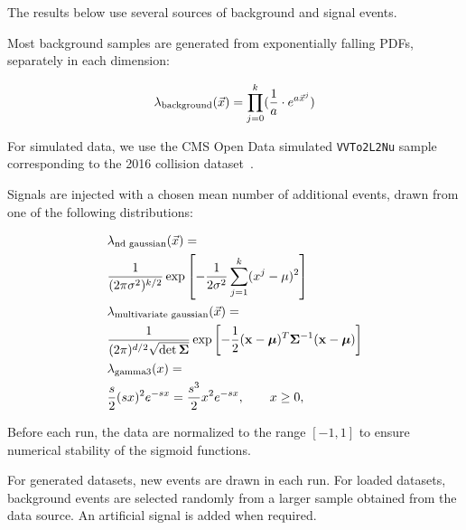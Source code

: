\documentclass[paper/ddppaper2.tex]{subfiles}
\begin{document}
The results below use several sources of background and signal events.

Most background samples are generated from exponentially falling PDFs, separately in each dimension:

\begin{equation}
    {{\lambda}_{\text{background}}(\vec{{x}})} = \prod\limits_{j=0}^k (\dfrac{1}{a} \cdot e^{a\vec{{x}}^j})
\end{equation}

For simulated data, we use the CMS Open Data simulated \texttt{VVTo2L2Nu} sample corresponding to the 2016 collision dataset~\cite{CMS_OpenData_VVTo2L2Nu_2016}.

Signals are injected with a chosen mean number of additional events, drawn from one of the following distributions:

\begin{equation}
\label{eq:signal-shapes}
\begin{aligned}
    &\dist{\text{nd gaussian}}
    ={}\\
    &
    \frac{1}{(2\pi\sigma^2)^{k/2}}
    \exp\left[
        -\frac{1}{2\sigma^2}
        \sum_{j=1}^{k}(x^j-\mu)^2
    \right]
    \\
    &\dist{\text{multivariate gaussian}}
    ={}\\
    &
    \frac{1}
    {(2\pi)^{d/2}\sqrt{\det\boldsymbol{\Sigma}}}
    \exp\left[
        -\frac{1}{2}
        (\mathbf{x}-\boldsymbol{\mu})^{T}
        \boldsymbol{\Sigma}^{-1}
        (\mathbf{x}-\boldsymbol{\mu})
    \right]
    \\
    &\pdf_{\text{gamma3}}(\eventsymbol)
    ={}\\
    &
    \frac{s}{2}
    (s \eventsymbol)^2
    e^{-s \eventsymbol}
    =
    \frac{s^3}{2}\eventsymbol^2 e^{-s \eventsymbol},
    \qquad \eventsymbol \geq 0,
\end{aligned}
\end{equation}

Before each run, the data are normalized to the range $[-1, 1]$ to ensure numerical stability of the sigmoid functions.

For generated datasets, new events are drawn in each run. For loaded datasets, background events are selected randomly from a larger sample obtained from the data source. An artificial signal is added when required.
\end{document}
